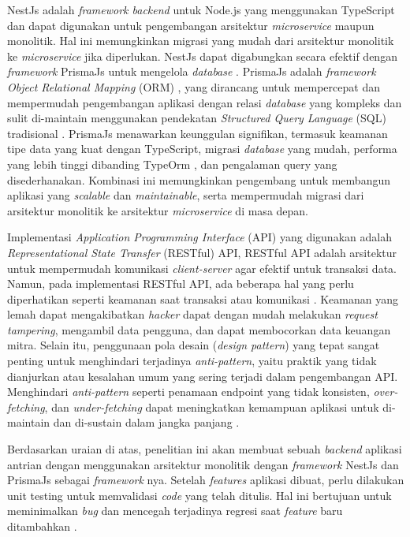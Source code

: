 NestJs adalah \textit{framework backend} untuk Node.js yang menggunakan TypeScript dan dapat digunakan untuk pengembangan arsitektur \textit{microservice} maupun monolitik. Hal ini memungkinkan migrasi yang mudah dari arsitektur monolitik ke \textit{microservice} jika diperlukan. NestJs dapat digabungkan secara efektif dengan \textit{framework} PrismaJs untuk mengelola \textit{database} \cite{NestJS}. PrismaJs adalah \textit{framework Object Relational Mapping} (ORM) \cite{Prisma}, yang dirancang untuk mempercepat dan mempermudah pengembangan aplikasi dengan relasi \textit{database} yang kompleks dan sulit di-maintain menggunakan pendekatan \textit{Structured Query Language} (SQL) tradisional \cite{Zmaranda2020}. PrismaJs menawarkan keunggulan signifikan, termasuk keamanan tipe data yang kuat dengan TypeScript, migrasi \textit{database} yang mudah, performa yang lebih tinggi dibanding TypeOrm \cite{jamil2024use} \cite{kahvic2024prestandajamforelse}, dan pengalaman query yang disederhanakan. Kombinasi ini memungkinkan pengembang untuk membangun aplikasi yang \textit{scalable} dan \textit{maintainable}, serta mempermudah migrasi dari arsitektur monolitik ke arsitektur \textit{microservice} di masa depan.


Implementasi \textit{Application Programming Interface} (API) yang digunakan adalah \textit{Representational State Transfer} (RESTful) API, RESTful API adalah arsitektur untuk mempermudah komunikasi \textit{client-server} agar efektif untuk transaksi data. Namun, pada implementasi RESTful API, ada beberapa hal yang perlu diperhatikan seperti keamanan saat transaksi  atau komunikasi \cite{Beer2018}. Keamanan yang lemah dapat mengakibatkan \textit{hacker} dapat dengan mudah melakukan \textit{request tampering}, mengambil data pengguna, dan dapat membocorkan data keuangan mitra. Selain itu, penggunaan pola desain (\textit{design pattern}) yang tepat sangat penting untuk menghindari terjadinya \textit{anti-pattern}, yaitu praktik yang tidak dianjurkan atau kesalahan umum yang sering terjadi dalam pengembangan API. Menghindari \textit{anti-pattern} seperti penamaan endpoint yang tidak konsisten, \textit{over-fetching}, dan \textit{under-fetching} dapat meningkatkan kemampuan aplikasi untuk di-maintain dan di-sustain dalam jangka panjang \cite{Aghajani2018} \cite{Alshraiedeh2021}.

Berdasarkan uraian di atas, penelitian ini akan membuat sebuah \textit{backend} aplikasi antrian dengan menggunakan arsitektur monolitik dengan \textit{framework} NestJs dan PrismaJs sebagai \textit{framework} nya. Setelah \textit{features} aplikasi dibuat, perlu dilakukan unit testing untuk memvalidasi \textit{code} yang telah ditulis. Hal ini bertujuan untuk meminimalkan \textit{bug} dan mencegah terjadinya regresi saat \textit{feature} baru ditambahkan \cite{runeson2006survey}.

